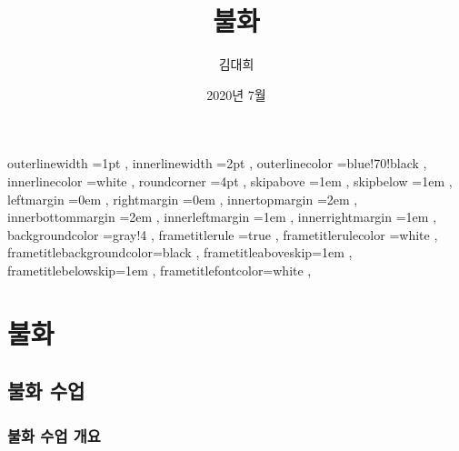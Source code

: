 \documentclass[12pt, a4paper, oneside]{book}
\let\stdsection\section
\renewcommand\section{\newpage\stdsection}
\begin{document}
	
			\dominitoc
			\doparttoc			




			\title{	불화 }
			\author{김대희}
			\date{2020년 7월}
			\maketitle


			\tableofcontents 		%
			\cleardoublepage
			\listoftables 			%





		 {
						outerlinewidth		=1pt			,%
						innerlinewidth		=2pt			,%
						outerlinecolor		=blue!70!black	,%
						innerlinecolor		=white 			,%
						roundcorner			=4pt			,%
						skipabove			=1em 			,%
						skipbelow			=1em 			,%
						leftmargin			=0em			,%
						rightmargin			=0em			,%
						innertopmargin		=2em 			,%
						innerbottommargin 	=2em 			,%
						innerleftmargin		=1em 			,%
						innerrightmargin		=1em 			,%
						backgroundcolor		=gray!4			,%
						frametitlerule		=true 			,%
						frametitlerulecolor	=white			,%
						frametitlebackgroundcolor=black		,%
						frametitleaboveskip=1em 			,%
						frametitlebelowskip=1em 			,%
						frametitlefontcolor=white 			,%
						}



	\part{불화}
	\noptcrule
	\parttoc				




	\chapter{불화 수업}
	\noptcrule

	\newpage	
	\minitoc





%
	\section{ 불화 수업 개요}
\end{document}
